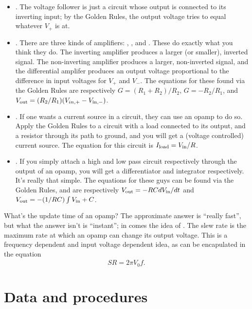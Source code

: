 \documentclass[11pt]{article}
\begin{document}
\begin{itemize}
	\item {}. The voltage follower is just a circuit
	whose output is connected to its inverting input; by the Golden
	Rules, the output voltage tries to equal whatever $V_+$ is at.
	\item {}. There are three kinds of amplifiers:
	, , and .
	These do exactly what you think they do. The inverting amplifier
	produces a larger (or smaller), inverted signal. The non-inverting amplifier
	produces a larger, non-inverted signal, and the differential
	amplifer produces an output voltage proportional to the difference
	in input voltages for $V_+$ and $V_-$. The equations for these found
	via the Golden Rules are respectively $G = (R_1 + R_2)/R_2$, $G = -R_2/R_1$,
	and $V_{\rm out} = (R_2/R_1)(V_{in, +} - V_{\rm in, -})$. \label{amplifiers}
	\item {}. If one wants a current source
	in a circuit, they can use an opamp to do so. Apply the Golden
	Rules to a circuit with a load connected to its output,
	and a resistor through its path to ground, and you will
	get a (voltage controlled) current source. The equation
	for this circuit is $I_{\rm load} = V_{\rm in}/R$. 
	\item {}. If you simply
	attach a high and low pass circuit respectively through the
	output of an opamp, you will get a differentiator and integrator
	respectively. It's really that simple. The equations for these
	guys can be found via the Golden Rules, and are respectively
	$V_{\rm out} = - RC dV_{\rm in}/dt$ and 
	$V_{\rm out} = - (1/RC) \int V_{\rm in} + C$.
\end{itemize}
What's the update time of an opamp? The approximate answer
is ``really fast'', but what the answer isn't is ``instant'';
in comes the idea of . The slew rate is the
maximum rate at which an opamp can change its output voltage.
This is a frequency dependent and input voltage dependent idea,
as can be encapulated in the equation
\begin{align}
	SR = 2\pi V_0 f.
	\label{slew}
\end{align}

\newpage
\section{Data and procedures}
\end{document}
